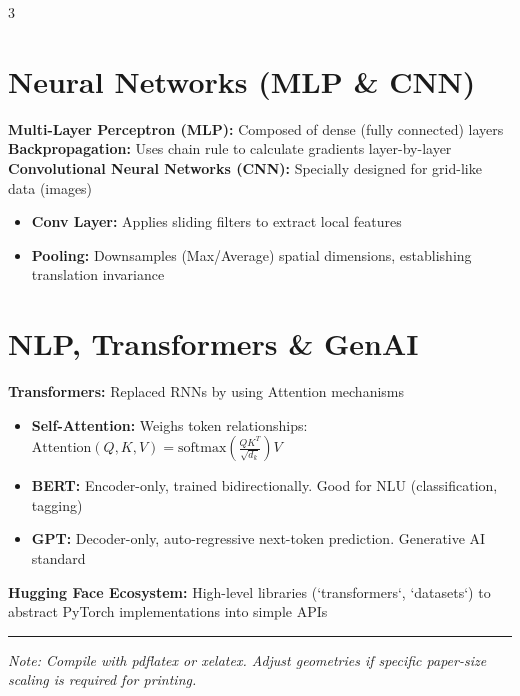 \documentclass[8pt,landscape]{extarticle}
\begin{document}
\begin{multicols*}{3}
\section{Neural Networks (MLP \& CNN)}
\textbf{Multi-Layer Perceptron (MLP):} Composed of dense (fully connected) layers %
\textbf{Backpropagation:} Uses chain rule to calculate gradients layer-by-layer %
\textbf{Convolutional Neural Networks (CNN):} Specially designed for grid-like data (images) %
\begin{itemize}
    \item \textbf{Conv Layer:} Applies sliding filters to extract local features %
    \item \textbf{Pooling:} Downsamples (Max/Average) spatial dimensions, establishing translation invariance %
\end{itemize}

\section{NLP, Transformers \& GenAI}
\textbf{Transformers:} Replaced RNNs by using Attention mechanisms %
\begin{itemize}
    \item \textbf{Self-Attention:} Weighs token relationships: $\text{Attention}(Q, K, V) = \text{softmax}\left(\frac{QK^T}{\sqrt{d_k}}\right)V$ %
    \item \textbf{BERT:} Encoder-only, trained bidirectionally. Good for NLU (classification, tagging) %
    \item \textbf{GPT:} Decoder-only, auto-regressive next-token prediction. Generative AI standard %
\end{itemize}
\textbf{Hugging Face Ecosystem:} High-level libraries (`transformers`, `datasets`) to abstract PyTorch implementations into simple APIs %

\rule{\linewidth}{0.5pt}
\scriptsize
\textit{Note: Compile with pdflatex or xelatex. Adjust geometries if specific paper-size scaling is required for printing.}
\end{multicols*}
\end{document}
